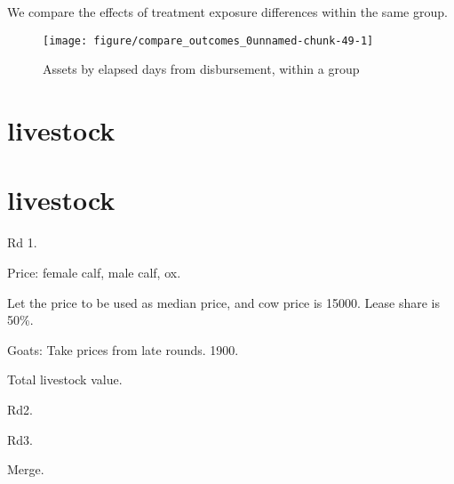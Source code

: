 We compare the effects of treatment exposure differences within the same group.
\begin{Schunk}
\begin{figure}

{\centering \texttt{[image: figure/compare\_outcomes\_0unnamed-chunk-49-1]} 

}

\caption[Assets by elapsed days from disbursement, within a group]{Assets by elapsed days from disbursement, within a group}\label{Figureunnamed-chunk-49}
\end{figure}
\end{Schunk}


\section{livestock}




\section{livestock}



Rd 1.

Price: female calf, male calf, ox.

Let the price to be used as median price, and cow price is 15000. Lease share is 50\%.

Goats: Take prices from late rounds. 1900.

Total livestock value.

Rd2.

Rd3.

Merge.

